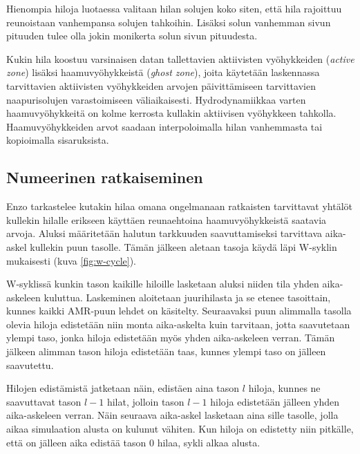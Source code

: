 \documentclass[12pt,a4paper]{article}
\begin{document}
Hienompia hiloja luotaessa valitaan hilan solujen koko siten, että hila rajoittuu reunoistaan vanhempansa solujen tahkoihin. Lisäksi solun vanhemman sivun pituuden tulee olla jokin monikerta solun sivun pituudesta. \cite{enzo}

Kukin hila koostuu varsinaisen datan tallettavien aktiivisten vyöhykkeiden (\textit{active zone}) lisäksi haamuvyöhykkeistä (\textit{ghost zone}), joita käytetään laskennassa tarvittavien aktiivisten vyöhykkeiden arvojen päivittämiseen tarvittavien naapurisolujen varastoimiseen väliaikaisesti. Hydrodynamiikkaa varten haamuvyöhykkeitä on kolme kerrosta kullakin aktiivisen vyöhykkeen tahkolla. Haamuvyöhykkeiden arvot saadaan interpoloimalla hilan vanhemmasta tai kopioimalla sisaruksista.\cite{arxivenzo, enzo}

\subsection{Numeerinen ratkaiseminen}
Enzo tarkastelee kutakin hilaa omana ongelmanaan ratkaisten tarvittavat yhtälöt kullekin hilalle erikseen käyttäen reunaehtoina haamuvyöhykkeistä saatavia arvoja. Aluksi määritetään halutun tarkkuuden saavuttamiseksi tarvittava aika-askel kullekin puun tasolle. Tämän jälkeen aletaan tasoja käydä läpi W-syklin mukaisesti (kuva \ref{fig:w-cycle}). \cite{enzo} %

W-syklissä kunkin tason kaikille hiloille lasketaan aluksi niiden tila yhden aika-askeleen kuluttua. Laskeminen aloitetaan juurihilasta ja se etenee tasoittain, kunnes kaikki AMR-puun lehdet on käsitelty. Seuraavaksi puun alimmalla tasolla olevia hiloja edistetään niin monta aika-askelta kuin tarvitaan, jotta saavutetaan ylempi taso, jonka hiloja edistetään myös yhden aika-askeleen verran. Tämän jälkeen alimman tason hiloja edistetään taas, kunnes ylempi taso on jälleen saavutettu. \cite{enzo}

Hilojen edistämistä jatketaan näin, edistäen aina tason $l$ hiloja, kunnes ne saavuttavat tason $l-1$ hilat, jolloin tason $l-1$ hiloja edistetään jälleen yhden aika-askeleen verran. Näin seuraava aika-askel lasketaan aina sille tasolle, jolla aikaa simulaation alusta on kulunut vähiten. Kun hiloja on edistetty niin pitkälle, että on jälleen aika edistää tason 0 hilaa, sykli alkaa alusta. \cite{enzo}
\end{document}
